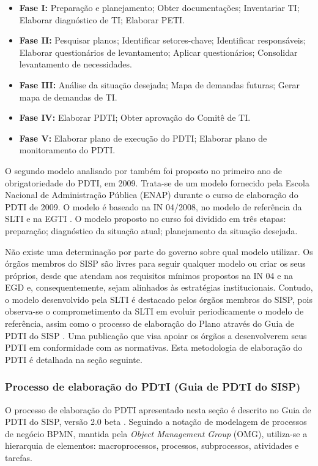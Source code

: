 \begin{itemize}
\item \textbf{Fase I:} Preparação e planejamento; Obter documentações; Inventariar TI; Elaborar diagnóstico de TI; Elaborar PETI.
\item \textbf{Fase II:} Pesquisar planos; Identificar setores-chave; Identificar responsáveis; Elaborar questionários de levantamento; Aplicar questionários; Consolidar levantamento de necessidades.
\item \textbf{Fase III:} Análise da situação desejada; Mapa de demandas futuras; Gerar mapa de demandas de TI.
\item \textbf{Fase IV:} Elaborar PDTI; Obter aprovação do Comitê de TI.
\item \textbf{Fase V:} Elaborar plano de execução do PDTI; Elaborar plano de monitoramento do PDTI.
\end{itemize}

O segundo modelo analisado por  também foi proposto no primeiro ano de obrigatoriedade do PDTI, em 2009. Trata-se de um modelo fornecido pela Escola Nacional de Administração Pública (ENAP) durante o curso de elaboração do PDTI de 2009. O modelo é baseado na IN 04/2008, no modelo de referência da SLTI e na EGTI \cite{cruz:08}. O modelo proposto no curso foi dividido em três etapas: preparação; diagnóstico da situação atual; planejamento da situação desejada.

Não existe uma determinação por parte do governo sobre qual modelo utilizar. Os órgãos membros do SISP são livres para seguir qualquer modelo ou criar os seus próprios, desde que atendam aos requisitos mínimos propostos na IN 04 e na EGD e, consequentemente, sejam alinhados às estratégias institucionais. Contudo, o modelo desenvolvido pela SLTI é destacado pelos órgãos membros do SISP, pois observa-se o comprometimento da SLTI em evoluir periodicamente o modelo de referência, assim como o processo de elaboração do Plano através do Guia de PDTI do SISP \cite{sisp:15}. Uma publicação que visa apoiar os órgãos a desenvolverem seus PDTI em conformidade com as normativas. Esta metodologia de elaboração do PDTI é detalhada na seção seguinte.

\subsubsection{Processo de elaboração do PDTI (Guia de PDTI do SISP)}
\label{secao:guia_pdti_sisp_cap3}
O processo de elaboração do PDTI apresentado nesta seção é descrito no Guia de PDTI do SISP, versão 2.0 beta \cite{sisp:15}. Seguindo a notação de modelagem de processos de negócio BPMN, mantida pela \textit{Object Management Group} (OMG), utiliza-se a hierarquia de elementos: macroprocessos, processos, subprocessos, atividades e tarefas.

